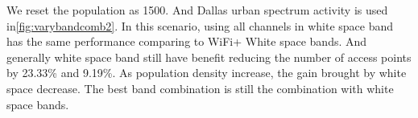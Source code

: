 We reset the population as 1500. And Dallas urban spectrum activity is used in\ref{fig:varybandcomb2}.
In this scenario, using all channels in white space band has the same performance comparing to WiFi+
White space bands. And generally white space band still have benefit reducing the number of access points
by 23.33\% and 9.19\%. As population density increase, the gain brought by white space decrease. The best
band combination is still the combination with white space bands. 

